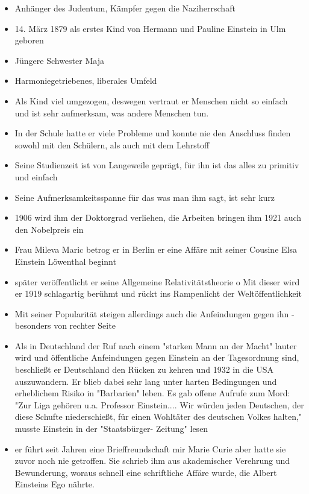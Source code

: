 \documentclass[12pt, a4paper, openany]{report}
\begin{document}
\begin{itemize}
\item Anhänger des Judentum, Kämpfer gegen die Naziherrschaft
\item 14. März 1879 als erstes Kind von Hermann und Pauline Einstein in Ulm geboren
\item Jüngere Schwester Maja
\item Harmoniegetriebenes, liberales Umfeld
\item Als Kind viel umgezogen, deswegen vertraut er Menschen nicht so einfach und ist sehr aufmerksam, was andere Menschen tun.
\item In der Schule hatte er viele Probleme und konnte nie den Anschluss finden sowohl mit den Schülern, als auch mit dem Lehrstoff
\item Seine Studienzeit ist von Langeweile geprägt, für ihn ist das alles zu primitiv und einfach
\item Seine Aufmerksamkeitsspanne für das was man ihm sagt, ist sehr kurz
\item 1906 wird ihm der Doktorgrad verliehen, die Arbeiten bringen ihm 1921 auch den Nobelpreis ein
\item Frau Mileva Maric betrog er in Berlin er eine Affäre mit seiner Cousine Elsa Einstein Löwenthal beginnt
\item später veröffentlicht er seine Allgemeine Relativitätstheorie 
o	Mit dieser wird er 1919 schlagartig berühmt und rückt ins Rampenlicht der Weltöffentlichkeit
\item Mit seiner Popularität steigen allerdings auch die Anfeindungen gegen ihn - besonders von rechter Seite
\item Als in Deutschland der Ruf nach einem "starken Mann an der Macht" lauter wird und öffentliche Anfeindungen gegen Einstein an der Tagesordnung sind, beschließt er Deutschland den Rücken zu kehren und 1932 in die USA auszuwandern. Er blieb dabei sehr lang unter harten Bedingungen und erheblichem Risiko in "Barbarien" leben. Es gab offene Aufrufe zum Mord: "Zur Liga gehören u.a. Professor Einstein.... Wir würden jeden Deutschen, der diese Schufte niederschießt, für einen Wohltäter des deutschen Volkes halten," musste Einstein in der "Staatsbürger- Zeitung" lesen
\item er führt seit Jahren eine Brieffreundschaft mir Marie Curie aber hatte sie zuvor noch nie getroffen. Sie schrieb ihm aus akademischer Verehrung und Bewunderung, woraus schnell eine schriftliche Affäre wurde, die Albert Einsteins Ego nährte.
\end{itemize}
\end{document}
